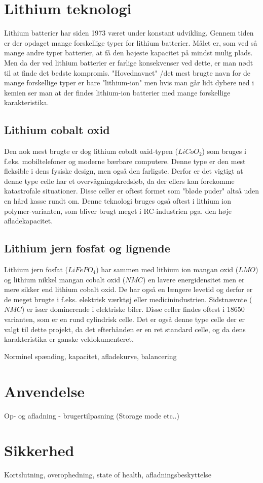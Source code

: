 \section{Lithium teknologi}
Lithium batterier har siden 1973 været under konstant udvikling. Gennem tiden er der opdaget mange forskellige typer for lithium batterier. Målet er, som ved så mange andre typer batterier, at få den højeste kapacitet på mindst mulig plads. Men da der ved lithium batterier er farlige konsekvenser ved dette, er man nødt til at finde det bedste kompromis. "Hovednavnet" \space /det mest brugte navn for de mange forskellige typer er bare "lithium-ion" \space men hvis man går lidt dybere ned i kemien ser man at der findes lithium-ion batterier med mange forskellige karakteristika. 

\subsection{Lithium cobalt oxid}
Den nok mest brugte er dog lithium cobalt oxid-typen ($LiCoO_2$) som bruges i f.eks. mobiltelefoner og moderne bærbare computere. Denne type er den mest fleksible i dens fysiske design, men også den farligste. Derfor er det vigtigt at denne type celle har et overvågningskredsløb, da der ellers kan forekomme katastrofale situationer. Disse celler er oftest formet som "bløde puder" \space \textemdash \space altså uden en hård kasse rundt om. Denne teknologi bruges også oftest i lithium ion polymer-varianten, som bliver brugt meget i RC-industrien pga. den høje afladekapacitet. 

\subsection{Lithium jern fosfat og lignende}
Lithium jern fosfat ($LiFePO_4$) har sammen med lithium ion mangan oxid ($LMO$) og lithium nikkel mangan cobalt oxid ($NMC$) en lavere energidensitet men er mere sikker end lithium cobalt oxid. De har også en længere levetid og derfor er de meget brugte i f.eks. elektrisk værktøj eller medicinindustrien. Sidstnævnte ($NMC$) er især dominerende i elektriske biler. Disse celler findes oftest i 18650 varianten, som er en rund cylindrisk celle. Det er også denne type celle der er valgt til dette projekt, da det efterhånden er en ret standard celle, og da dens karakteristika er ganske veldokumenteret. 

Norminel spænding, kapacitet, afladekurve, balancering

\section{Anvendelse}
Op- og afladning - brugertilpasning (Storage mode etc..)

\section{Sikkerhed}

Kortslutning, overophedning, state of health, afladningsbeskyttelse
